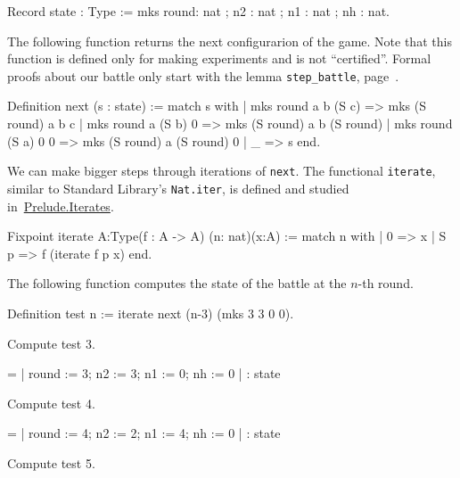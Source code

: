 \begin{Coqsrc}
 Record state : Type :=
    mks {round: nat ; n2 : nat ; n1 : nat ; nh : nat}.
\end{Coqsrc}

The following function returns the next configurarion of the game. 
Note that this function is defined only for making experiments and is not  ``certified''.  Formal proofs about our battle only start with the lemma
\texttt{step\_battle}, page~\pageref{lemma:step-battle}.


\begin{Coqsrc}
Definition next (s : state) :=
  match s with
  | mks round a b (S c) => mks (S round) a b c
  | mks round a (S b) 0 => mks (S round) a b (S round)
  | mks round (S a) 0 0 => mks (S round) a (S round) 0
  | _ => s
  end.
\end{Coqsrc}

We can make bigger steps through iterations of \texttt{next}.
The functional \texttt{iterate}, similar to Standard Library's \texttt{Nat.iter},
is defined and studied in~\href{../theories/html/hydras.Prelude.Iterates.html\#iterate}{Prelude.Iterates}.

\label{Functions:iterate}

\begin{Coqsrc}
Fixpoint iterate {A:Type}(f : A -> A) (n: nat)(x:A) :=
  match n with
  | 0 => x
  | S p => f (iterate  f p x)
  end.
\end{Coqsrc}



The following function computes the state of the battle at the $n$-th round.


\begin{Coqsrc}
Definition test n := iterate next (n-3) (mks 3 3 0 0).

Compute test 3.
\end{Coqsrc}

\begin{Coqanswer}
      = {| round := 3; n2 := 3; n1 := 0; nh := 0 |}
     : state 
\end{Coqanswer}

\begin{Coqsrc}
 Compute test 4.
\end{Coqsrc}

\begin{Coqanswer}
  = {| round := 4; n2 := 2; n1 := 4; nh := 0 |}
     : state
\end{Coqanswer}

\begin{Coqsrc}
Compute test 5.
\end{Coqsrc}

